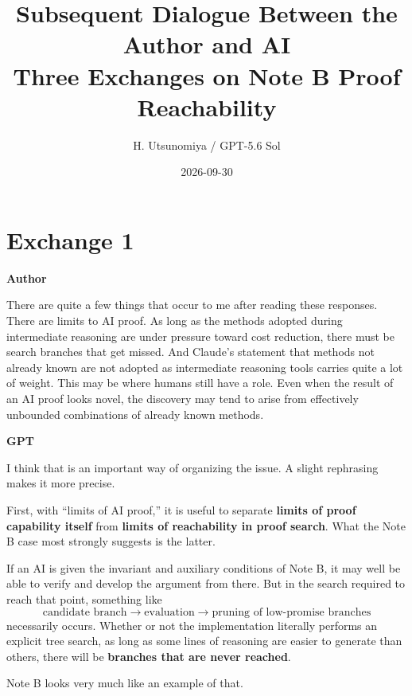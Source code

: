 \documentclass[11pt,a4paper]{article}
\title{\bfseries Subsequent Dialogue Between the Author and AI\\[4pt]
\large Three Exchanges on Note B Proof Reachability}
\author{H. Utsunomiya / GPT-5.6 Sol}
\date{2026-09-30}
\newcommand{\speaker}[1]{\par\medskip\noindent\textsf{\bfseries #1}\par\smallskip}
\begin{document}
\maketitle
\begin{center}
\end{center}

\section*{Exchange 1}
\speaker{Author}
There are quite a few things that occur to me after reading these responses. There are limits to AI proof. As long as the methods adopted during intermediate reasoning are under pressure toward cost reduction, there must be search branches that get missed. And Claude's statement that methods not already known are not adopted as intermediate reasoning tools carries quite a lot of weight. This may be where humans still have a role. Even when the result of an AI proof looks novel, the discovery may tend to arise from effectively unbounded combinations of already known methods.

\speaker{GPT}
I think that is an important way of organizing the issue. A slight rephrasing makes it more precise.

First, with “limits of AI proof,” it is useful to separate \textbf{limits of proof capability itself} from \textbf{limits of reachability in proof search}. What the Note B case most strongly suggests is the latter.

If an AI is given the invariant and auxiliary conditions of Note B, it may well be able to verify and develop the argument from there. But in the search required to reach that point, something like
\[
\text{candidate branch}
\longrightarrow
\text{evaluation}
\longrightarrow
\text{pruning of low-promise branches}
\]
necessarily occurs. Whether or not the implementation literally performs an explicit tree search, as long as some lines of reasoning are easier to generate than others, there will be \textbf{branches that are never reached}.

Note B looks very much like an example of that.
\end{document}
